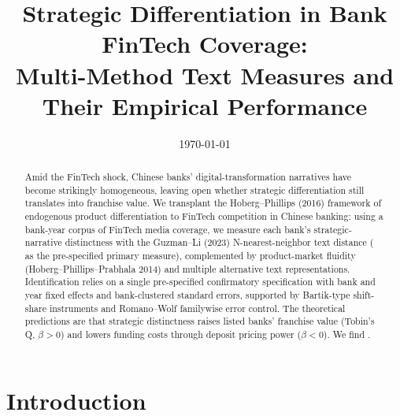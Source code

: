 




\title{Strategic Differentiation in Bank FinTech Coverage:\\Multi-Method Text Measures and Their Empirical Performance}
\author{}
\date{\today}


\maketitle

\begin{abstract}
Amid the FinTech shock, Chinese banks' digital-transformation
narratives have become strikingly homogeneous, leaving open whether
strategic differentiation still translates into franchise value. We
transplant the Hoberg--Phillips (2016) framework of endogenous
product differentiation to FinTech competition in Chinese banking:
using a bank-year corpus of FinTech media coverage, we measure each
bank's strategic-narrative distinctness with the Guzman--Li (2023)
N-nearest-neighbor text distance ( as the
pre-specified primary measure), complemented by product-market
fluidity (Hoberg--Phillips--Prabhala 2014) and multiple alternative
text representations. Identification relies on a single
pre-specified confirmatory specification with bank and year fixed
effects and bank-clustered standard errors, supported by Bartik-type
shift-share instruments and Romano--Wolf familywise error control.
The theoretical predictions are that strategic distinctness raises
listed banks' franchise value (Tobin's Q, $\beta>0$) and lowers
funding costs through deposit pricing power ($\beta<0$). We find
\@.
\end{abstract}

\section{Introduction}\label{sec:intro}

